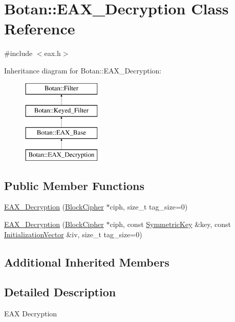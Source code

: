 \hypertarget{classBotan_1_1EAX__Decryption}{\section{Botan\-:\-:E\-A\-X\-\_\-\-Decryption Class Reference}
\label{classBotan_1_1EAX__Decryption}
}


{\ttfamily \#include $<$eax.\-h$>$}

Inheritance diagram for Botan\-:\-:E\-A\-X\-\_\-\-Decryption\-:\begin{figure}[H]
\begin{center}
\leavevmode
\includegraphics[height=4.000000cm]{classBotan_1_1EAX__Decryption}
\end{center}
\end{figure}
\subsection*{Public Member Functions}
\begin{DoxyCompactItemize}
\item 
\hyperlink{classBotan_1_1EAX__Decryption_a5c6d28f635eda35c886105f88aad71f5}{E\-A\-X\-\_\-\-Decryption} (\hyperlink{classBotan_1_1BlockCipher}{Block\-Cipher} $\ast$ciph, size\-\_\-t tag\-\_\-size=0)
\item 
\hyperlink{classBotan_1_1EAX__Decryption_aa7f08f7c73b7247892f5e44cb3c74fae}{E\-A\-X\-\_\-\-Decryption} (\hyperlink{classBotan_1_1BlockCipher}{Block\-Cipher} $\ast$ciph, const \hyperlink{namespaceBotan_a00c78597211d5c63b63e2a57ddb96d38}{Symmetric\-Key} \&key, const \hyperlink{namespaceBotan_ab6a07e859c4e3a2ccfd68308ec89497e}{Initialization\-Vector} \&iv, size\-\_\-t tag\-\_\-size=0)
\end{DoxyCompactItemize}
\subsection*{Additional Inherited Members}


\subsection{Detailed Description}
E\-A\-X Decryption 

